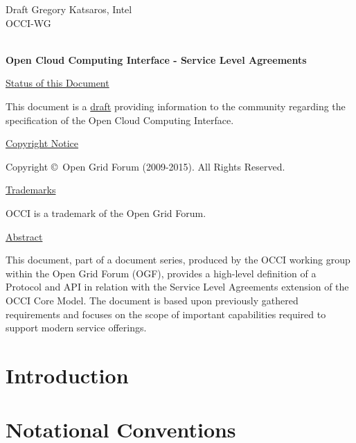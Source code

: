 \documentclass[10pt,a4paper]{article}
\begin{document}
\thispagestyle{empty}

Draft \hfill  Gregory Katsaros, Intel\\
OCCI-WG \hfill  \\
\rightline {\today}\\

\vspace*{0.5in}

\begin{Large}
\textbf{Open Cloud Computing Interface - Service Level Agreements}
\end{Large}

\vspace*{0.5in}

\underline{Status of this Document}

This document is a \underline{draft} providing information to the community regarding the specification of the Open Cloud Computing Interface.

\underline{Copyright Notice}

Copyright \copyright ~Open Grid Forum (2009-2015). All Rights
Reserved.

\underline{Trademarks}

OCCI is a trademark of the Open Grid Forum.

\underline{Abstract}

%

This document, part of a document series, produced by the OCCI working group within the Open Grid Forum (OGF), provides a high-level definition of a Protocol and API in relation with the Service Level Agreements extension of the OCCI Core Model. The document is based upon previously gathered requirements and focuses on the scope of important capabilities required to support modern service offerings.


\newpage
\tableofcontents
\newpage

\section{Introduction}



\section{Notational Conventions}


\end{document}
